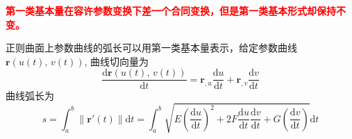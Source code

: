 \textcolor{red}{\textbf{第一类基本量在容许参数变换下差一个合同变换，但是第一类基本形式却保持不变。}}

正则曲面上参数曲线的弧长可以用第一类基本量表示，给定参数曲线$\mathbf{r}\left(u(t),\, v(t)\right)$, 
曲线切向量为
\begin{equation}
    \frac{\mathrm{d}\mathbf{r}\left(u(t),\, v(t)\right)}{\mathrm{d}t} = 
    \mathbf{r}_{,u}\frac{\mathrm{d}u}{\mathrm{d}t} + \mathbf{r}_{,v}\frac{\mathrm{d}v}{\mathrm{d}t}
\end{equation}
曲线弧长为
\begin{equation}
    s=\int_{a}^{b}\|\mathbf{r}'\left(t\right)\|\mathrm{d}t = 
    \int_{a}^{b}\sqrt{E\left(\frac{\mathrm{d}u}{\mathrm{d}t}\right)^{2} + 
    2F\frac{\mathrm{d}u}{\mathrm{d}t}\frac{\mathrm{d}v}{\mathrm{d}t} + 
    G\left(\frac{\mathrm{d}v}{\mathrm{d}t}\right)}\mathrm{d}t
\end{equation}

